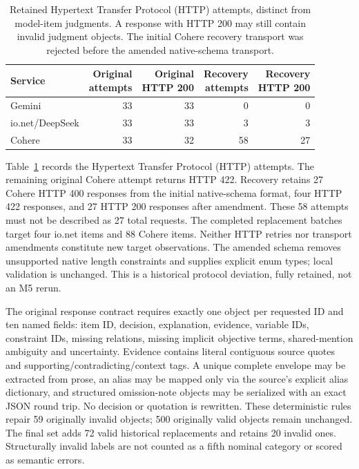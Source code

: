 \begin{table}[htbp]\centering\small
\caption{Retained Hypertext Transfer Protocol (HTTP) attempts, distinct from model-item judgments. A response with HTTP 200 may still contain invalid judgment objects. The initial Cohere recovery transport was rejected before the amended native-schema transport.}\label{tab:relationship-requests}
\begin{tabular}{@{}lrrrr@{}}\toprule
Service & \shortstack{Original\\attempts} & \shortstack{Original\\HTTP 200} & \shortstack{Recovery\\attempts} & \shortstack{Recovery\\HTTP 200}\\\midrule
Gemini & 33 & 33 & 0 & 0\\
io.net/DeepSeek & 33 & 33 & 3 & 3\\
Cohere & 33 & 32 & 58 & 27\\\bottomrule
\end{tabular}\end{table}
Table~\ref{tab:relationship-requests} records the Hypertext Transfer Protocol (HTTP) attempts. The remaining original Cohere attempt returns HTTP 422. Recovery retains 27 Cohere HTTP 400 responses from the initial native-schema format, four HTTP 422 responses, and 27 HTTP 200 responses after amendment. These 58 attempts must not be described as 27 total requests. The completed replacement batches target four io.net items and 88 Cohere items. Neither HTTP retries nor transport amendments constitute new target observations. The amended schema removes unsupported native length constraints and supplies explicit enum types; local validation is unchanged. This is a historical protocol deviation, fully retained, not an M5 rerun.

The original response contract requires exactly one object per requested ID and ten named fields: item ID, decision, explanation, evidence, variable IDs, constraint IDs, missing relations, missing implicit objective terms, shared-mention ambiguity and uncertainty. Evidence contains literal contiguous source quotes and supporting/contradicting/context tags. A unique complete envelope may be extracted from prose, an alias may be mapped only via the source's explicit alias dictionary, and structured omission-note objects may be serialized with an exact JSON round trip. No decision or quotation is rewritten. These deterministic rules repair 59 originally invalid objects; 500 originally valid objects remain unchanged. The final set adds 72 valid historical replacements and retains 20 invalid ones. Structurally invalid labels are not counted as a fifth nominal category or scored as semantic errors.

